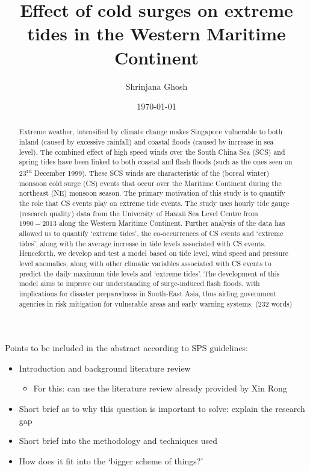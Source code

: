 \documentclass[12pt]{article}
\begin{document}
\title{\vspace{-2.0cm}Effect of cold surges on extreme tides in the Western Maritime Continent}
\author{Shrinjana Ghosh}
\date{\today}
\vfill





\maketitle

\begin{abstract}
    Extreme weather, intensified by climate change makes Singapore vulnerable to both inland (caused by excessive rainfall) and coastal floods
    (caused by increase in sea level). The combined effect of high speed winds over the South China Sea (SCS) and spring tides have been linked to 
    both coastal and flash floods (such as the ones seen on 23\textsuperscript{rd} December 1999).
    These SCS winds are characteristic of the (boreal winter) monsoon cold surge (CS) events that 
    occur over the Maritime Continent during the northeast (NE) monsoon season. The primary motivation of this study is to quantify the role that CS events
    play on extreme tide events. The study uses hourly tide gauge (research quality) data from the University of Hawaii Sea Level Centre from $1990-2013$ along the 
    Western Maritime Continent. Further analysis of the data has allowed us to quantify `extreme tides', the co-occurrences of CS events and `extreme tides', along with the
    average increase in tide levels associated with CS events. Henceforth, we develop and test a model based on tide level, wind speed and pressure level anomalies,
    along with other climatic variables associated with CS events to predict the daily maximum tide levels and `extreme tides'. The development of this model
    aims to improve our understanding of surge-induced flash floods, with implications for disaster preparedness in South-East Asia, thus aiding
    government agencies in risk mitigation for vulnerable areas and early warning systems.
    \newline (232 words)
\end{abstract}



\begin{paragraph}
    \noindent Points to be included in the abstract according to SPS guidelines: 
\begin{itemize}
    \item Introduction and background literature review
    \begin{itemize}
        \item For this: can use the literature review already provided by Xin Rong
    \end{itemize}
    \item Short brief as to why this question is important to solve: explain the research gap 
    \item Short brief into the methodology and techniques used 
    \item How does it fit into the `bigger scheme of things?'
\end{itemize}
\end{paragraph} 
\end{document}
